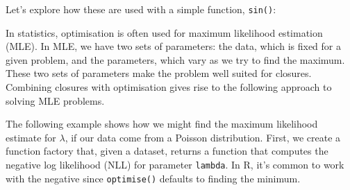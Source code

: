 Let's explore how these are used with a simple function, \texttt{sin()}:

\begin{Shaded}
\begin{Highlighting}[]
\NormalTok{(}\StringTok{ }\NormalTok{(} \NormalTok{/}\StringTok{ }\NormalTok{, } \NormalTok{/}\StringTok{ }\NormalTok{)))}
\NormalTok{(}\NormalTok{(}\NormalTok{, } \NormalTok{*}\StringTok{ }
\NormalTok{(}\NormalTok{(} \NormalTok{))}
\end{Highlighting}
\end{Shaded}

In statistics, optimisation is often used for maximum likelihood
estimation (MLE). In MLE, we have two sets of parameters: the data,
which is fixed for a given problem, and the parameters, which vary as we
try to find the maximum. These two sets of parameters make the problem
well suited for closures. Combining closures with optimisation gives
rise to the following approach to solving MLE problems.

The following example shows how we might find the maximum likelihood
estimate for $\lambda$, if our data come from a Poisson distribution.
First, we create a function factory that, given a dataset, returns a
function that computes the negative log likelihood (NLL) for parameter
\texttt{lambda}. In R, it's common to work with the negative since
\texttt{optimise()} defaults to finding the minimum.

\begin{Shaded}
\begin{Highlighting}[]
\StringTok{ }
  \StringTok{ }
  \StringTok{ }
    \StringTok{ }\StringTok{ }\StringTok{ }
  \NormalTok{\}}
\NormalTok{\}}
\end{Highlighting}
\end{Shaded}


